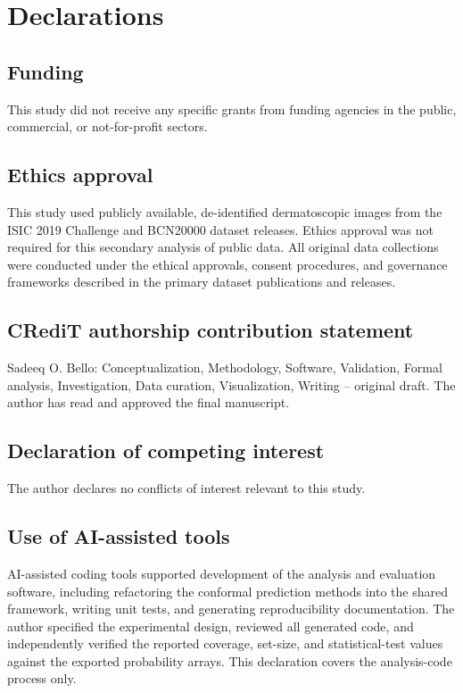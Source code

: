 ﻿\documentclass[preprint,12pt]{elsarticle}
\begin{document}
\section*{Declarations}

\subsection*{Funding}
This study did not receive any specific grants from funding agencies in the public, commercial, or not-for-profit sectors.

\subsection*{Ethics approval}
This study used publicly available, de-identified dermatoscopic images from the ISIC 2019 Challenge and BCN20000 dataset releases. Ethics approval was not required for this secondary analysis of public data. All original data collections were conducted under the ethical approvals, consent procedures, and governance frameworks described in the primary dataset publications and releases.

\subsection*{CRediT authorship contribution statement}
Sadeeq O. Bello: Conceptualization, Methodology, Software, Validation, Formal analysis, Investigation, Data curation, Visualization, Writing -- original draft. The author has read and approved the final manuscript.

\subsection*{Declaration of competing interest}
The author declares no conflicts of interest relevant to this study.

\subsection*{Use of AI-assisted tools}
AI-assisted coding tools supported development of the analysis and evaluation software, including refactoring the conformal prediction methods into the shared framework, writing unit tests, and generating reproducibility documentation. The author specified the experimental design, reviewed all generated code, and independently verified the reported coverage, set-size, and statistical-test values against the exported probability arrays. This declaration covers the analysis-code process only.
\end{document}
